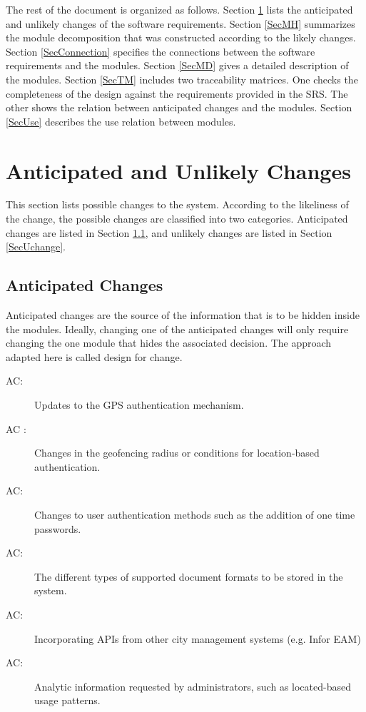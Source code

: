\documentclass[12pt, titlepage]{article}
\newcounter{acnum}
\newcommand{\actheacnum}{AC\theacnum}
\begin{document}
The rest of the document is organized as follows. Section
\ref{SecChange} lists the anticipated and unlikely changes of the software
requirements. Section \ref{SecMH} summarizes the module decomposition that
was constructed according to the likely changes. Section \ref{SecConnection}
specifies the connections between the software requirements and the
modules. Section \ref{SecMD} gives a detailed description of the
modules. Section \ref{SecTM} includes two traceability matrices. One checks
the completeness of the design against the requirements provided in the SRS. The
other shows the relation between anticipated changes and the modules. Section
\ref{SecUse} describes the use relation between modules.

\section{Anticipated and Unlikely Changes} \label{SecChange}

This section lists possible changes to the system. According to the likeliness
of the change, the possible changes are classified into two
categories. Anticipated changes are listed in Section \ref{SecAchange}, and
unlikely changes are listed in Section \ref{SecUchange}.

\subsection{Anticipated Changes} \label{SecAchange}

Anticipated changes are the source of the information that is to be hidden
inside the modules. Ideally, changing one of the anticipated changes will only
require changing the one module that hides the associated decision. The approach
adapted here is called design for
change.

\begin{description}
  \item[ \actheacnum \label{acGps}:] Updates to the
    GPS authentication mechanism.
  \item[ \actheacnum
    \label{acLocationThreshod}:] Changes in
    the geofencing radius or conditions for location-based authentication.
  \item[ \actheacnum \label{acAuthenticationMethods}:]
    Changes to user authentication methods such as the addition of one time
    passwords.
  \item[ \actheacnum \label{acDocuments}:] The different
    types of supported document formats to be stored in the system.
  \item[ \actheacnum \label{acIntegration}:] Incorporating
    APIs from other city management systems (e.g. Infor EAM)
  \item[ \actheacnum \label{acDataLogs}:] Analytic
    information requested by administrators, such as located-based
    usage patterns.
\end{description}
\end{document}
